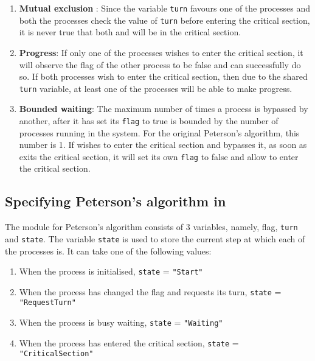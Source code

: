 \documentclass[fleqn]{tukseminar}
\begin{document}
			\begin{enumerate}
				\item \textbf{Mutual exclusion} : Since the variable \lstinline|turn| favours one of the processes and both the
				processes check the value of \lstinline|turn| before entering the critical section, it is never true that
				both \pa and \pb will be in the critical section.
				\item \textbf{Progress}: If only one of the processes wishes to enter the critical section, it will observe
				the flag of the other process to be false and can successfully do so. If both processes
				wish to enter the critical section, then due to the shared \lstinline|turn| variable, at least one of the
				processes will be able to make progress.
				\item \textbf{Bounded waiting}: The maximum number of times a process is bypassed by another,
				after it has set its \lstinline|flag| to true is bounded by the number of processes running in the
				system. For the original Peterson’s algorithm, this number is 1. If \pa wishes to enter the
				critical section and \pb bypasses it, as soon as \pb exits the critical section, it will set its
				own \lstinline|flag| to false and allow \pa to enter the critical section.
			\end{enumerate}
			
			\subsection{Specifying Peterson's algorithm in \tla}
			The module for Peterson’s algorithm consists of 3 variables, namely, flag, \lstinline|turn| and \lstinline|state|. The
			variable \lstinline|state| is used to store the current step at which each of the processes is. It can take one
			of the following values:
			
			\begin{enumerate}
				\item When the process is initialised, \lstinline|state| = \lstinline|"Start"|
				\item When the process has changed the flag and requests its turn, \lstinline|state| = \lstinline|"RequestTurn"|
				\item When the process is busy waiting, \lstinline|state| = \lstinline|"Waiting"|
				\item When the process has entered the critical section, \lstinline|state| = \lstinline|"CriticalSection"|
			\end{enumerate}
			
\end{document}
